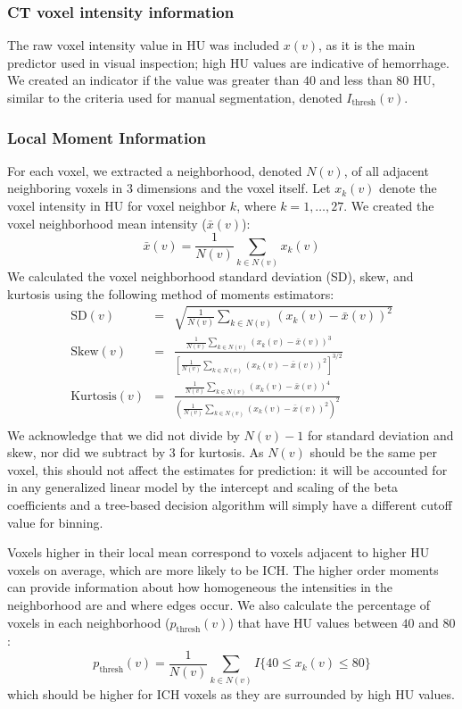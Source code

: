 \subsubsection{CT voxel intensity information} The raw voxel intensity value in HU was included $x(v)$, as it is the main predictor used in visual inspection; high HU values are indicative of hemorrhage. We created an indicator if the value was greater than $40$ and less than $80$ HU, similar to the criteria used for manual segmentation, denoted $I_{\text{thresh}}(v)$. 

\subsubsection{Local Moment Information} For each voxel, we extracted a neighborhood, denoted $N(v)$, of all adjacent neighboring voxels in $3$ dimensions and the voxel itself.  Let $x_k(v)$ denote the voxel intensity in HU for voxel neighbor $k$, where $k = 1, \dots, 27$.  We created the voxel neighborhood mean intensity ($\bar{x}(v)$):
\begin{equation}
\bar{x}(v) = \frac{1}{N(v)} \sum_{k \in N(v)} x_k(v) \label{eq:mean}
\end{equation}
We calculated the voxel neighborhood standard deviation (SD), skew, and kurtosis using the following method of moments estimators:
\begin{eqnarray*}
\text{SD}(v) &=& \sqrt{ \frac{1}{N(v)} \sum_{k \in N(v)} \left(x_k(v) - \bar{x}(v)\right)^2 } \\
\text{Skew}(v) &=& \frac{ \frac{1}{N(v)} \sum\limits_{k \in N(v)} (x_k(v)-\bar{x}(v) )^3 } {\left[ \frac{1}{N(v)} \sum\limits_{k \in N(v)} (x_k(v)- \bar{x}(v))^2\right]^{3/2}} \\
\text{Kurtosis}(v) &=& \frac{ \frac{1}{N(v)} \sum\limits_{k \in N(v)} (x_k(v)-\bar{x}(v) )^4 }{ \left( \frac{1}{N(v)} \sum\limits_{k \in N(v)} \left(x_k(v) - \bar{x}(v)\right)^2\right)^2} \\
\label{eq:moment}
\end{eqnarray*}
We acknowledge that we did not divide by $N(v) - 1$ for standard deviation and skew, nor did we subtract by $3$ for kurtosis.  As $N(v)$ should be the same per voxel, this should not affect the estimates for prediction: it will be accounted for in any generalized linear model by the intercept and scaling of the beta coefficients and a tree-based decision algorithm will simply have a different cutoff value for binning.

Voxels higher in their local mean correspond to voxels adjacent to higher HU voxels on average, which are more likely to be ICH.  The higher order moments can provide information about how homogeneous the intensities in the neighborhood are and where edges occur.  We also calculate the percentage of voxels in each neighborhood ($p_{\text{thresh}}(v)$) that have HU values between $40$ and $80$:
\begin{equation}
p_{\text{thresh}}(v) = \frac{1}{N(v)} \sum_{k \in N(v)} I\{ 40 \leq x_k(v) \leq 80 \} \label{eq:pct}
\end{equation}
which should be higher for ICH voxels as they are surrounded by high HU values.  

